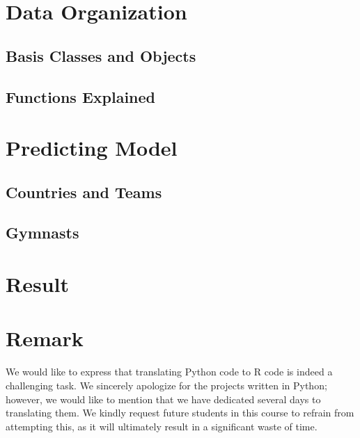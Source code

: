 \documentclass{article}
\theoremstyle{roman}
\begin{document}
\section{Data Organization}
\subsection{Basis Classes and Objects}
\subsection{Functions Explained}
\section{Predicting Model}
\subsection{Countries and Teams}
\subsection{Gymnasts}
\section{Result}

\section*{Remark}
We would like to express that translating Python code to R code is indeed a challenging task. We sincerely apologize for the projects written in Python; however, we would like to mention that we have dedicated several days to translating them. We kindly request future students in this course to refrain from attempting this, as it will ultimately result in a significant waste of time.


\end{document}
